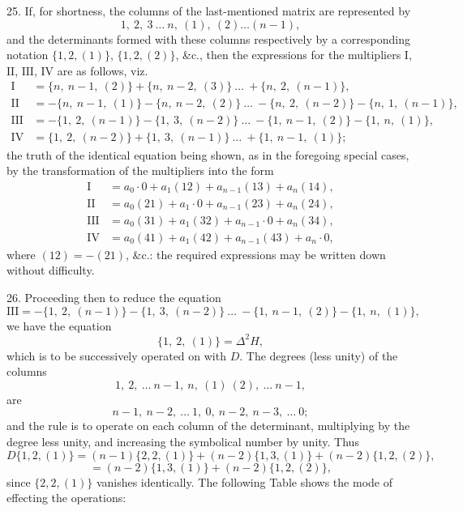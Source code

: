 \documentclass[11pt]{article}
\begin{document}
25. If, for shortness, the columns of the last-mentioned matrix are represented by
\[
1,\ 2,\ 3\ \ldots\ n,\ (1),\ (2)\ldots(n-1),
\]
and the determinants formed with these columns respectively by a corresponding notation $\{1, 2, (1)\}$, $\{1, 2, (2)\}$, \&c., then the expressions for the multipliers $\mathrm{I}$, $\mathrm{II}$, $\mathrm{III}$, $\mathrm{IV}$ are as follows, viz.
\[
\begin{aligned}
\mathrm{I} &= \{n,\ n-1,\ (2)\} + \{n,\ n-2,\ (3)\}\ \ldots\ + \{n,\ 2,\ (n-1)\},\\
\mathrm{II} &= -\{n,\ n-1,\ (1)\} - \{n,\ n-2,\ (2)\}\ \ldots\ - \{n,\ 2,\ (n-2)\} - \{n,\ 1,\ (n-1)\},\\
\mathrm{III} &= -\{1,\ 2,\ (n-1)\} - \{1,\ 3,\ (n-2)\}\ \ldots\ - \{1,\ n-1,\ (2)\} - \{1,\ n,\ (1)\},\\
\mathrm{IV} &= \{1,\ 2,\ (n-2)\} + \{1,\ 3,\ (n-1)\}\ \ldots\ + \{1,\ n-1,\ (1)\};
\end{aligned}
\]
the truth of the identical equation being shown, as in the foregoing special cases, by the transformation of the multipliers into the form
\[
\begin{aligned}
\mathrm{I} &= a_0 \cdot 0 + a_1(12) + a_{n-1}(13) + a_n(14),\\
\mathrm{II} &= a_0(21) + a_1 \cdot 0 + a_{n-1}(23) + a_n(24),\\
\mathrm{III} &= a_0(31) + a_1(32) + a_{n-1} \cdot 0 + a_n(34),\\
\mathrm{IV} &= a_0(41) + a_1(42) + a_{n-1}(43) + a_n \cdot 0,
\end{aligned}
\]
where $(12) = -(21)$, \&c.: the required expressions may be written down without difficulty.

\medskip

26. Proceeding then to reduce the equation
\[
\mathrm{III} = -\{1,\ 2,\ (n-1)\} - \{1,\ 3,\ (n-2)\}\ \ldots\ - \{1,\ n-1,\ (2)\} - \{1,\ n,\ (1)\},
\]
we have the equation
\[
\{1,\ 2,\ (1)\} = \Delta^2 H,
\]
which is to be successively operated on with $D$. The degrees (less unity) of the columns
\[
1,\ 2,\ \ldots\ n-1,\ n,\ (1)\ (2),\ \ldots\ n-1,
\]
are
\[
n-1,\ n-2,\ \ldots\ 1,\ 0,\ n-2,\ n-3,\ \ldots\ 0;
\]
and the rule is to operate on each column of the determinant, multiplying by the degree less unity, and increasing the symbolical number by unity. Thus
\[
D\{1, 2, (1)\} = (n-1)\{2, 2, (1)\} + (n-2)\{1, 3, (1)\} + (n-2)\{1, 2, (2)\},
\]
\[
= (n-2)\{1, 3, (1)\} + (n-2)\{1, 2, (2)\},
\]
since $\{2, 2, (1)\}$ vanishes identically. The following Table shows the mode of effecting the operations:
\end{document}
